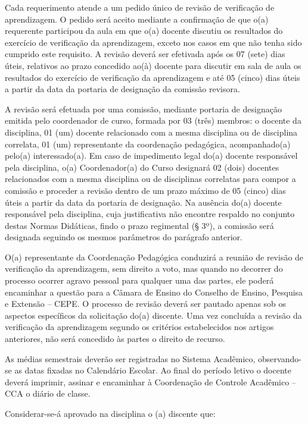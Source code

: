	Cada requerimento atende a um pedido único de revisão de verificação de aprendizagem. O pedido será aceito mediante a confirmação de que o(a) requerente participou da aula em que o(a) docente discutiu os resultados do exercício de verificação da aprendizagem, exceto nos casos em que não tenha sido cumprido este requisito. A revisão deverá ser efetivada após os 07 (sete) dias úteis, relativos ao prazo concedido ao(à) docente para discutir em sala de aula os resultados do exercício de verificação da aprendizagem e até 05 (cinco) dias úteis a partir da data da portaria de designação da comissão revisora. 

	A revisão será efetuada por uma comissão, mediante portaria de designação emitida pelo coordenador de curso, formada por 03 (três) membros: o docente da disciplina, 01 (um) docente relacionado com a mesma disciplina ou de disciplina correlata, 01 (um) representante da coordenação pedagógica, acompanhado(a) pelo(a) interessado(a). Em caso de impedimento legal do(a) docente responsável pela disciplina, o(a) Coordenador(a) do Curso designará 02 (dois) docentes relacionados com a mesma disciplina ou de disciplinas correlatas para compor a comissão e proceder a revisão dentro de um prazo máximo de 05 (cinco) dias úteis a partir da data da portaria de designação.  Na ausência do(a) docente responsável pela disciplina, cuja justificativa não encontre respaldo no conjunto destas Normas Didáticas, findo o prazo regimental (§ 3º), a comissão será designada seguindo os mesmos parâmetros do parágrafo anterior.

	O(a) representante da Coordenação Pedagógica conduzirá a reunião de revisão de verificação da aprendizagem, sem direito a voto, mas quando no decorrer do processo ocorrer agravo pessoal para qualquer uma das partes, ele poderá encaminhar a questão para a Câmara de Ensino do Conselho de Ensino, Pesquisa e Extensão – CEPE. O processo de revisão deverá ser pautado apenas sob os aspectos específicos da solicitação do(a) discente. Uma vez concluída a revisão da verificação da aprendizagem segundo os critérios estabelecidos nos artigos anteriores, não será concedido às partes o direito de recurso. 

	As médias semestrais deverão ser registradas no Sistema Acadêmico, observando-se as datas fixadas no Calendário Escolar. Ao final do período letivo o docente deverá imprimir, assinar e encaminhar à Coordenação de Controle Acadêmico – CCA o diário de classe. 

Considerar-se-á aprovado na disciplina o (a) discente que: 

